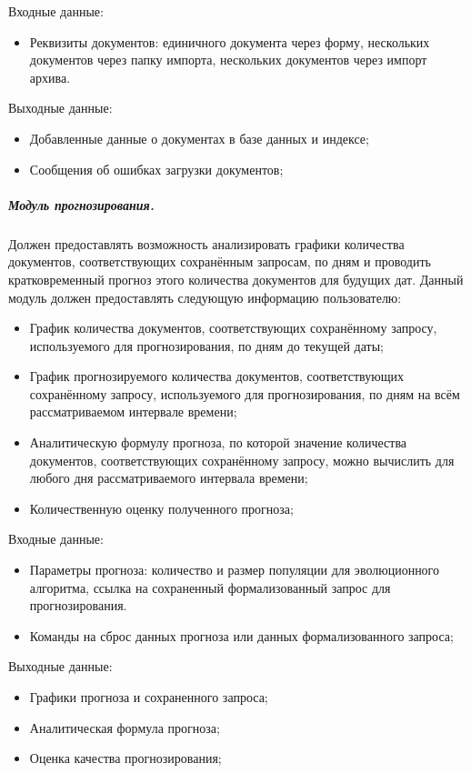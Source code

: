 Входные данные:
\begin{itemize}
\item Реквизиты документов: единичного документа через форму, нескольких документов через папку импорта, нескольких документов через импорт архива.
\end{itemize}

Выходные данные:
\begin{itemize}
\item Добавленные данные о документах в базе данных и индексе;
\item Сообщения об ошибках загрузки документов;
\end{itemize}

\subparagraph{Модуль прогнозирования.}

Должен предоставлять возможность анализировать графики количества документов, соответствующих сохранённым запросам, по дням и проводить кратковременный прогноз этого количества документов для будущих дат. Данный модуль должен предоставлять следующую информацию пользователю:
\begin{itemize}
\item График количества документов, соответствующих сохранённому запросу, используемого для прогнозирования, по дням до текущей даты;
\item График прогнозируемого количества документов, соответствующих сохранённому запросу, используемого для прогнозирования, по дням на всём рассматриваемом интервале времени;
\item Аналитическую формулу прогноза, по которой значение количества документов, соответствующих сохранённому запросу, можно вычислить для любого дня рассматриваемого интервала времени;
\item Количественную оценку полученного прогноза;
\end{itemize}

Входные данные:
\begin{itemize}
\item Параметры прогноза: количество и размер популяции для эволюционного алгоритма, ссылка на сохраненный формализованный запрос для прогнозирования.
\item Команды на сброс данных прогноза или данных формализованного запроса;
\end{itemize}

Выходные данные:
\begin{itemize}
\item Графики прогноза и сохраненного запроса;
\item Аналитическая формула прогноза;
\item Оценка качества прогнозирования;
\end{itemize}

